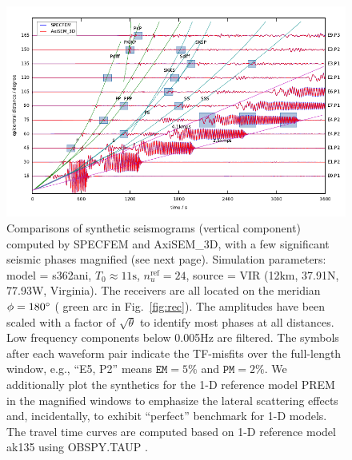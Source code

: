 \documentclass[extra,referee]{gji}
\begin{document}
\begin{figure}
  \centering
  \includegraphics[width=\textwidth]{fig/section/VIR_s3_11_24.pdf}\vspace{-10pt}
  \caption{Comparisons of synthetic seismograms (vertical component) computed 
  by SPECFEM and AxiSEM\_3D, with a few significant seismic phases magnified (see next page).
  Simulation parameters: model = s362ani, 
  $T_0\approx11\text{s}$, $n_u^\text{ref}=24$, 
  source = VIR (12km, 37.91\degr N, 77.93\degr W, Virginia). 
  The receivers are all located on the meridian $\phi=180\hbox{$^\circ$}$ (
  green arc in Fig.~\ref{fig:rec}). 
  The amplitudes have been scaled with a factor of $\sqrt\theta$ 
  to identify most phases at all distances. 
  Low frequency components below 0.005Hz are filtered.
  The symbols after each waveform pair indicate the TF-misfits over the full-length 
  window, e.g., ``E5, P2'' means $\mathtt{EM}=5\%$ and $\mathtt{PM}=2\%$.
  We additionally plot the synthetics for the 1-D reference model PREM in the 
  magnified windows to emphasize the lateral scattering effects
  and, incidentally, to exhibit ``perfect'' benchmark for 1-D models. 
  The travel time curves are computed based on 1-D reference model ak135 
  \cite[]{kennett1995constraints} using OBSPY.TAUP \cite[]{krischer2015obspy}. }
  \label{fig:freq}
\end{figure} 
\end{document}
